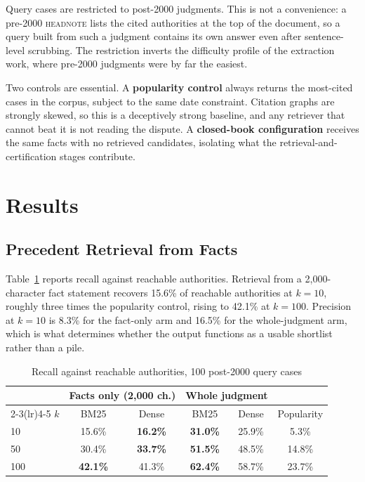 \documentclass[10pt,conference]{IEEEtran}
\begin{document}
Query cases are restricted to post-2000 judgments. This is not a convenience: a pre-2000
\textsc{headnote} lists the cited authorities at the top of the document, so a query built
from such a judgment contains its own answer even after sentence-level scrubbing. The
restriction inverts the difficulty profile of the extraction work, where pre-2000 judgments
were by far the easiest.

Two controls are essential. A \textbf{popularity control} always returns the most-cited
cases in the corpus, subject to the same date constraint. Citation graphs are strongly
skewed, so this is a deceptively strong baseline, and any retriever that cannot beat it is
not reading the dispute. A \textbf{closed-book configuration} receives the same facts with no
retrieved candidates, isolating what the retrieval-and-certification stages contribute.

\section{Results}
\label{sec:results}

\subsection{Precedent Retrieval from Facts}

Table~\ref{tab:recall} reports recall against reachable authorities. Retrieval from a
2{,}000-character fact statement recovers 15.6\% of reachable authorities at $k{=}10$,
roughly three times the popularity control, rising to 42.1\% at $k{=}100$. Precision at
$k{=}10$ is 8.3\% for the fact-only arm and 16.5\% for the whole-judgment arm, which is what
determines whether the output functions as a usable shortlist rather than a pile.

\begin{table}[t]
\caption{Recall against reachable authorities, 100 post-2000 query cases}
\label{tab:recall}
\centering
\footnotesize
\begin{tabular}{@{}lccccc@{}}
\toprule
& \multicolumn{2}{c}{Facts only (2{,}000 ch.)} & \multicolumn{2}{c}{Whole judgment} & \\
\cmidrule(lr){2-3}\cmidrule(lr){4-5}
$k$ & BM25 & Dense & BM25 & Dense & Popularity \\
\midrule
10  & 15.6\% & \textbf{16.2\%} & \textbf{31.0\%} & 25.9\% & 5.3\% \\
50  & 30.4\% & \textbf{33.7\%} & \textbf{51.5\%} & 48.5\% & 14.8\% \\
100 & \textbf{42.1\%} & 41.3\% & \textbf{62.4\%} & 58.7\% & 23.7\% \\
\bottomrule
\end{tabular}
\end{table}
\end{document}
